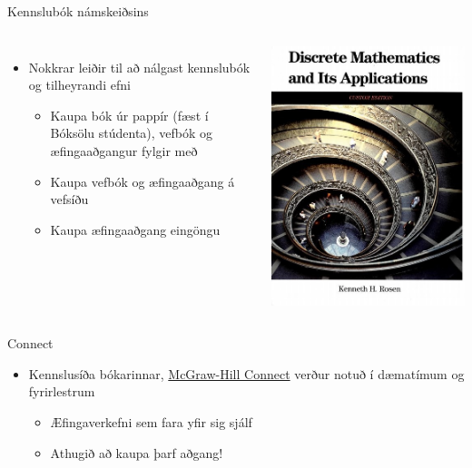 \documentclass{beamer}
\begin{document}
\begin{frame}{Kennslubók námskeiðsins}
\begin{columns}
\begin{itemize}
 \item Nokkrar leiðir til að nálgast kennslubók og tilheyrandi efni
 \begin{itemize}
  \item Kaupa bók úr pappír (fæst í Bóksölu stúdenta), vefbók og æfingaaðgangur fylgir með
  \item Kaupa vefbók og æfingaaðgang á vefsíðu
  \item Kaupa æfingaaðgang eingöngu
 \end{itemize}
\end{itemize}
\begin{center}
\includegraphics[width=0.7\linewidth]{Pics/rosen}
\end{center}
\end{columns}
\end{frame}

\begin{frame}{Connect}
\begin{itemize}
 \item Kennslusíða bókarinnar, \href{http://connect.mheducation.com/class/tol104g16}{McGraw-Hill Connect} verður notuð í dæmatímum og fyrirlestrum
 \begin{itemize}
  \item Æfingaverkefni sem fara yfir sig sjálf 
  \item Athugið að kaupa þarf aðgang!
 \end{itemize}
\end{itemize}
\end{frame}
\end{document}
